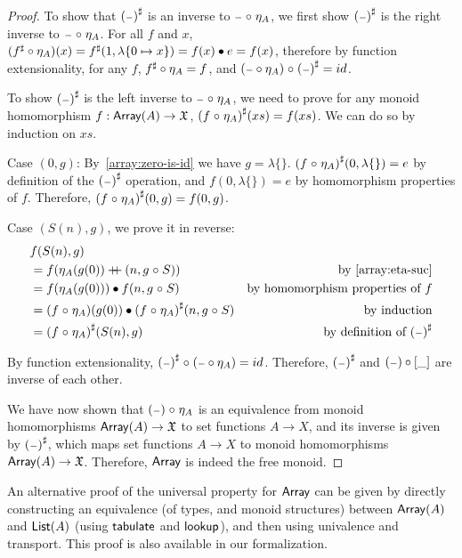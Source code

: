 \begin{proof}
    To show that ${({\scriptstyle{-}})}^{\sharp}$ is an inverse to ${\scriptstyle{-}} \mathrel{\circ} \eta_A$,
    we first show ${({\scriptstyle{-}})}^{\sharp}$ is the right inverse to ${\scriptstyle{-}} \mathrel{\circ} \eta_A$.
    For all $f$ and $x$, $({f}^{\sharp} \circ \eta_A)(x) = {f}^{\sharp}(1, \lambda\{0 \mapsto x\}) = f(x) \mathbin{\bullet} e = f(x)$,
    therefore by function extensionality, for any $f$, ${f}^{\sharp} \circ \eta_A = f$,
    and $({\scriptstyle{-}} \circ \eta_A) \mathrel{\circ} {({\scriptstyle{-}})}^{\sharp} = id$.

    To show ${({\scriptstyle{-}})}^{\sharp}$ is the left inverse to ${\scriptstyle{-}} \mathrel{\circ} \eta_A$, we need to prove
    for any monoid homomorphism $f : \operatorname{\mathsf{Array}}(A) \to \mathfrak{X}$, ${(f \mathrel{\circ} \eta_A)}^{\sharp}(xs) = f(xs)$.
    We can do so by induction on $xs$.

    Case $(0, g)$:
    By~\ref{array:zero-is-id} we have $g = \lambda\{\}$.
    ${(f \mathrel{\circ} \eta_A)}^{\sharp}(0, \lambda\{\}) = e$ by definition of the ${({\scriptstyle{-}})}^{\sharp}$ operation,
    and $f(0, \lambda\{\}) = e$ by homomorphism properties of $f$.
    Therefore, ${(f \mathrel{\circ} \eta_A)}^{\sharp}(0, g) = f(0, g)$.

    Case $(S(n), g)$, we prove it in reverse:
    \begin{align*}
         & f(S(n), g)                                                                                                     \\
         & = f(\eta_A(g(0)) \mathbin{+\kern -0.4em+} (n, g \mathrel{\circ} S))                        & \text{by~\ref{array:eta-suc}}            \\
         & = f(\eta_A(g(0))) \mathbin{\bullet} f(n, g \mathrel{\circ} S)                             & \text{by homomorphism properties of $f$} \\
         & = (f \mathrel{\circ} \eta_A)(g(0)) \mathbin{\bullet} {(f \mathrel{\circ} \eta_A)}^{\sharp}(n, g \mathrel{\circ} S) & \text{by induction}                      \\
         & = {(f \mathrel{\circ} \eta_A)}^{\sharp}(S(n), g)                                   & \text{by definition of ${({\scriptstyle{-}})}^{\sharp}$}
    \end{align*}

    By function extensionality, ${({\scriptstyle{-}})}^{\sharp} \mathrel{\circ} ({\scriptstyle{-}} \circ \eta_A) = id$.
    Therefore, ${({\scriptstyle{-}})}^{\sharp}$ and $({\scriptstyle{-}}) \circ [\_]$ are inverse of each other.

    We have now shown that $({\scriptstyle{-}}) \mathrel{\circ} \eta_A$ is an equivalence from
    monoid homomorphisms $\operatorname{\mathsf{Array}}(A) \to \mathfrak{X}$
    to set functions $A \to X$, and its inverse is given by ${({\scriptstyle{-}})}^{\sharp}$, which maps set
    functions $A \to X$ to monoid homomorphisms $\operatorname{\mathsf{Array}}(A) \to \mathfrak{X}$. Therefore, $\operatorname{\mathsf{Array}}$ is indeed
    the free monoid.

\end{proof}

An alternative proof of the universal property for $\operatorname{\mathsf{Array}}$ can be given by directly constructing an equivalence (of
types, and monoid structures) between $\operatorname{\mathsf{Array}}(A)$ and $\operatorname{\mathsf{List}}(A)$ (using $\operatorname{\mathsf{tabulate}}$ and $\operatorname{\mathsf{lookup}}$), and then
using univalence and transport.
%
This proof is also available in our formalization.
